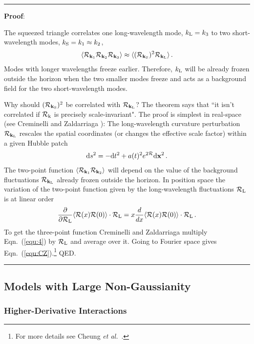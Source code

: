 \documentclass[12pt,letterpaper,rotate]{article}
\def\beq{\begin{equation}}
\def\eeq{\end{equation}}
\def\d{{\rm d}}
\def\R{{\cal R}}
\begin{document}
{\vspace{0.5cm}
 \hrule \vspace{0.3cm}
{\bf Proof}:

The squeezed triangle correlates one long-wavelength mode, $k_{\rm L} = k_3$ to two short-wavelength modes, $k_{\rm S}=k_1 \approx k_2$,
\beq
\langle \R_{{\bf k}_1} \R_{{\bf k}_2} \R_{{\bf k}_3} \rangle  \approx \langle (\R_{{\bf k}_{\rm S} })^2 \R_{{\bf k}_{\rm L}}\rangle\, .
\eeq
Modes with longer wavelengths freeze earlier. Therefore, $k_{\rm L}$ will be already frozen outside the horizon when the two smaller modes freeze and acts as a background field for the two short-wavelength modes.

Why should $(\R_{{\bf k}_{\rm S} })^2$ be correlated with  $\R_{{\bf k}_{\rm L}}$?
The theorem says that ``it isn't correlated if $\R_{\rm k}$ is precisely scale-invariant".
The proof is simplest in real-space (see Creminelli and Zaldarriaga \cite{Creminelli:2004yq}):
The long-wavelength curvature perturbation $\R_{{\bf k}_{\rm L}}$ rescales the spatial coordinates (or changes the effective scale factor) within a given Hubble patch
\beq
\d s^2 =  - \d t^2 + a(t)^2 e^{2\R} \d {\bf x}^2\, .
\eeq
The two-point function $\langle \R_{{\bf k}_1} \R_{{\bf k}_2} \rangle$ will depend on the value of the background fluctuations $\R_{{\bf k}_{\rm L}}$ already frozen outside the horizon. In position space the variation of the two-point function given by the long-wavelength fluctuations $\R_{\rm L}$ is at linear order
\beq
\label{equ:4}
\frac{\partial}{\partial \R_{\rm L}} \langle \R(x) \R(0) \rangle \cdot \R_{\rm L} = x \frac{d}{dx} \langle \R(x) \R(0) \rangle \cdot \R_{\rm L} \, .
\eeq 
To get the three-point function Creminelli and Zaldarriaga multiply Eqn.~(\ref{equ:4}) by $\R_{\rm L}$ and average over it.
Going to Fourier space gives Eqn.~(\ref{equ:CZ}).\footnote{For more details see Cheung {\it et al.}~\cite{Cheung:2007sv}.}
QED.
\vspace{0.2cm}  \hrule
 \vspace{0.5cm}
 

\subsection{Models with Large Non-Gaussianity}

\subsubsection{Higher-Derivative Interactions}


}
\end{document}
